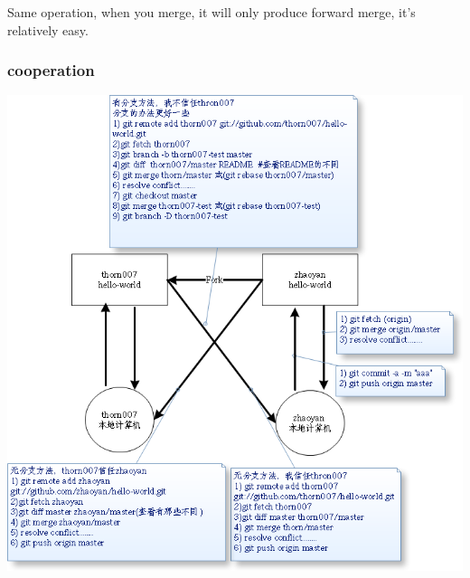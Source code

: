 \documentclass[a4paper,12pt,twoside]{book}
\begin{document}
Same operation, when you merge, it will only produce forward merge, it's relatively easy.

\subsubsection{cooperation}
\includegraphics[scale=0.8]{pics/git-corp} \\

\end{document}
